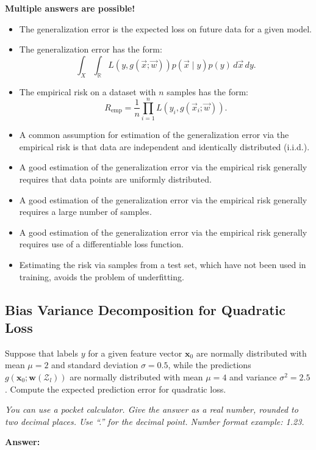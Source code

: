 \documentclass{article}
\begin{document}
\textbf{Multiple answers are possible!}

\begin{itemize}
    \item[(a)] The generalization error is the expected loss on future data for a given model.
    \item[(b)] The generalization error has the form:
    \[
    \int_X \int_{\mathbb{R}} L(y, g(\vec{x}; \vec{w})) p(\vec{x} \mid y) p(y) \, d\vec{x} \, dy.
    \]
    \item[(c)] The empirical risk on a dataset with \(n\) samples has the form:
    \[
    R_{\text{emp}} = \frac{1}{n} \prod_{i=1}^n L(y_i, g(\vec{x}_i; \vec{w})).
    \]
    \item[(d)] A common assumption for estimation of the generalization error via the empirical risk is that data are independent and identically distributed (i.i.d.).
    \item[(e)] A good estimation of the generalization error via the empirical risk generally requires that data points are uniformly distributed.
    \item[(f)] A good estimation of the generalization error via the empirical risk generally requires a large number of samples.
    \item[(g)] A good estimation of the generalization error via the empirical risk generally requires use of a differentiable loss function.
    \item[(h)] Estimating the risk via samples from a test set, which have not been used in training, avoids the problem of underfitting.
\end{itemize}

\subsection*{Bias Variance Decomposition for Quadratic Loss}

Suppose that labels \(y\) for a given feature vector \(\mathbf{x}_0\) are normally distributed with mean \(\mu = 2\) and standard deviation \(\sigma = 0.5\), while the predictions \(g(\mathbf{x}_0; \mathbf{w}(\mathcal{Z}_l))\) are normally distributed with mean \(\mu = 4\) and variance \(\sigma^2 = 2.5\). Compute the expected prediction error for quadratic loss.

\textit{You can use a pocket calculator. Give the answer as a real number, rounded to two decimal places. Use ``.'' for the decimal point. Number format example: 1.23.}

\textbf{Answer:}
\end{document}

